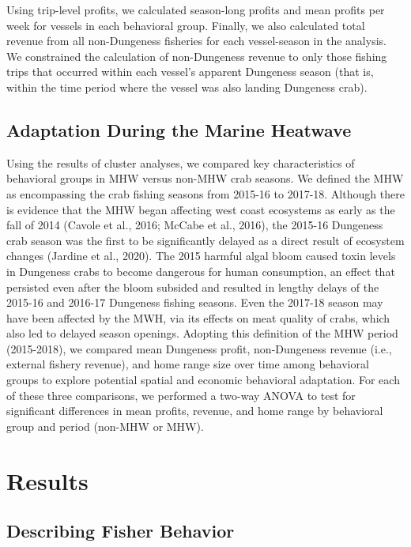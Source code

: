 \documentclass[]{elsarticle} %
\begin{document}
Using trip-level profits, we calculated season-long profits and mean
profits per week for vessels in each behavioral group. Finally, we also
calculated total revenue from all non-Dungeness fisheries for each
vessel-season in the analysis. We constrained the calculation of
non-Dungeness revenue to only those fishing trips that occurred within
each vessel's apparent Dungeness season (that is, within the time period
where the vessel was also landing Dungeness crab).

\hypertarget{adaptation-during-the-marine-heatwave}{%
\subsection{Adaptation During the Marine
Heatwave}\label{adaptation-during-the-marine-heatwave}}

Using the results of cluster analyses, we compared key characteristics
of behavioral groups in MHW versus non-MHW crab seasons. We defined the
MHW as encompassing the crab fishing seasons from 2015-16 to 2017-18.
Although there is evidence that the MHW began affecting west coast
ecosystems as early as the fall of 2014 (Cavole et al., 2016; McCabe et
al., 2016), the 2015-16 Dungeness crab season was the first to be
significantly delayed as a direct result of ecosystem changes (Jardine
et al., 2020). The 2015 harmful algal bloom caused toxin levels in
Dungeness crabs to become dangerous for human consumption, an effect
that persisted even after the bloom subsided and resulted in lengthy
delays of the 2015-16 and 2016-17 Dungeness fishing seasons. Even the
2017-18 season may have been affected by the MWH, via its effects on
meat quality of crabs, which also led to delayed season openings.
Adopting this definition of the MHW period (2015-2018), we compared mean
Dungeness profit, non-Dungeness revenue (i.e., external fishery
revenue), and home range size over time among behavioral groups to
explore potential spatial and economic behavioral adaptation. For each
of these three comparisons, we performed a two-way ANOVA to test for
significant differences in mean profits, revenue, and home range by
behavioral group and period (non-MHW or MHW).

\hypertarget{results}{%
\section{Results}\label{results}}

\hypertarget{describing-fisher-behavior}{%
\subsection{Describing Fisher
Behavior}\label{describing-fisher-behavior}}
\end{document}
